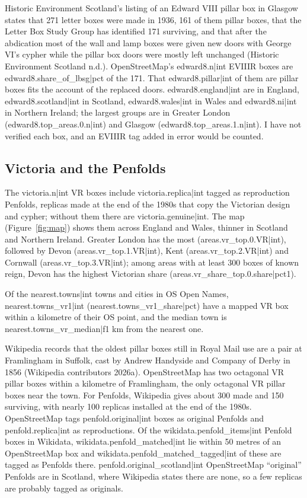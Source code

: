 \documentclass[11pt,a4paper]{article}
\begin{document}
Historic Environment Scotland's listing of an Edward VIII pillar box in Glasgow states that 271 letter boxes were made in 1936, 161 of them pillar boxes, that the Letter Box Study Group has identified 171 surviving, and that after the abdication most of the wall and lamp boxes were given new doors with George VI's cypher while the pillar box doors were mostly left unchanged (Historic Environment Scotland n.d.). OpenStreetMap's {{edward8.n|int}} EVIIIR boxes are {{edward8.share_of_lbsg|pct}} of the 171. That {{edward8.pillar|int}} of them are pillar boxes fits the account of the replaced doors. {{edward8.england|int}} are in England, {{edward8.scotland|int}} in Scotland, {{edward8.wales|int}} in Wales and {{edward8.ni|int}} in Northern Ireland; the largest groups are in Greater London ({{edward8.top_areas.0.n|int}}) and Glasgow ({{edward8.top_areas.1.n|int}}). I have not verified each box, and an EVIIIR tag added in error would be counted.

\subsection{Victoria and the Penfolds}

The {{victoria.n|int}} VR boxes include {{victoria.replica|int}} tagged as reproduction Penfolds, replicas made at the end of the 1980s that copy the Victorian design and cypher; without them there are {{victoria.genuine|int}}. The map (Figure~\ref{fig:map}) shows them across England and Wales, thinner in Scotland and Northern Ireland. Greater London has the most ({{areas.vr_top.0.VR|int}}), followed by Devon ({{areas.vr_top.1.VR|int}}), Kent ({{areas.vr_top.2.VR|int}}) and Cornwall ({{areas.vr_top.3.VR|int}}); among areas with at least 300 boxes of known reign, Devon has the highest Victorian share ({{areas.vr_share_top.0.share|pct1}}).

Of the {{nearest.towns|int}} towns and cities in OS Open Names, {{nearest.towns_vr1|int}} ({{nearest.towns_vr1_share|pct}}) have a mapped VR box within a kilometre of their OS point, and the median town is {{nearest.towns_vr_median|f1}} km from the nearest one.

Wikipedia records that the oldest pillar boxes still in Royal Mail use are a pair at Framlingham in Suffolk, cast by Andrew Handyside and Company of Derby in 1856 (Wikipedia contributors 2026a). OpenStreetMap has two octagonal VR pillar boxes within a kilometre of Framlingham, the only octagonal VR pillar boxes near the town. For Penfolds, Wikipedia gives about 300 made and 150 surviving, with nearly 100 replicas installed at the end of the 1980s. OpenStreetMap tags {{penfold.original|int}} boxes as original Penfolds and {{penfold.replica|int}} as reproductions. Of the {{wikidata.penfold_items|int}} Penfold boxes in Wikidata, {{wikidata.penfold_matched|int}} lie within 50 metres of an OpenStreetMap box and {{wikidata.penfold_matched_tagged|int}} of these are tagged as Penfolds there. {{penfold.original_scotland|int}} OpenStreetMap ``original'' Penfolds are in Scotland, where Wikipedia states there are none, so a few replicas are probably tagged as originals.
\end{document}
